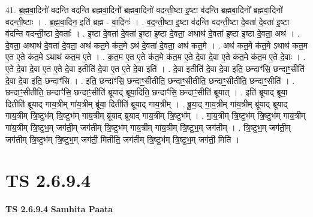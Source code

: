 \documentclass[17pt]{extarticle}
\begin{document}
41. ब्र॒ह्म॒वा॒दिनो॑ वदन्ति वदन्ति ब्रह्मवा॒दिनो᳚ ब्रह्मवा॒दिनो॑ वदन्ती॒ष्टा इ॒ष्टा व॑दन्ति ब्रह्मवा॒दिनो᳚ ब्रह्मवा॒दिनो॑ वदन्ती॒ष्टाः । . ब्र॒ह्म॒वा॒दिन॒ इति॑ ब्रह्म - वा॒दिनः॑ । . व॒द॒न्ती॒ष्टा इ॒ष्टा व॑दन्ति वदन्ती॒ष्टा दे॒वता॑ दे॒वता॑ इ॒ष्टा व॑दन्ति वदन्ती॒ष्टा दे॒वताः᳚ । . इ॒ष्टा दे॒वता॑ दे॒वता॑ इ॒ष्टा इ॒ष्टा दे॒वता॒ अथाथ॑ दे॒वता॑ इ॒ष्टा इ॒ष्टा दे॒वता॒ अथ॑ । . दे॒वता॒ अथाथ॑ दे॒वता॑ दे॒वता॒ अथ॑ कत॒मे क॑त॒मे ऽथ॑ दे॒वता॑ दे॒वता॒ अथ॑ कत॒मे । . अथ॑ कत॒मे क॑त॒मे ऽथाथ॑ कत॒म ए॒त ए॒ते क॑त॒मे ऽथाथ॑ कत॒म ए॒ते । . क॒त॒म ए॒त ए॒ते क॑त॒मे क॑त॒म ए॒ते दे॒वा दे॒वा ए॒ते क॑त॒मे क॑त॒म ए॒ते दे॒वाः । . ए॒ते दे॒वा दे॒वा ए॒त ए॒ते दे॒वा इतीति॑ दे॒वा ए॒त ए॒ते दे॒वा इति॑ । . दे॒वा इतीति॑ दे॒वा दे॒वा इति॒ छन्दाꣳ॑सि॒ छन्दाꣳ॒॒सीति॑ दे॒वा दे॒वा इति॒ छन्दाꣳ॑सि । . इति॒ छन्दाꣳ॑सि॒ छन्दाꣳ॒॒सीतीति॒ छन्दाꣳ॒॒सीतीति॒ छन्दाꣳ॒॒सीतीति॒ छन्दाꣳ॒॒सीति॑ । . छन्दाꣳ॒॒सीतीति॒ छन्दाꣳ॑सि॒ छन्दाꣳ॒॒सीति॑ ब्रूयाद् ब्रूया॒दिति॒ छन्दाꣳ॑सि॒ छन्दाꣳ॒॒सीति॑ ब्रूयात् । . इति॑ ब्रूयाद् ब्रूया॒ दितीति॑ ब्रूयाद् गाय॒त्रीम् गा॑य॒त्रीम् ब्रू॑या॒ दितीति॑ ब्रूयाद् गाय॒त्रीम् । . ब्रू॒या॒द् गा॒य॒त्रीम् गा॑य॒त्रीम् ब्रू॑याद् ब्रूयाद् गाय॒त्रीम् त्रि॒ष्टुभ॑म् त्रि॒ष्टुभ॑म् गाय॒त्रीम् ब्रू॑याद् ब्रूयाद् गाय॒त्रीम् त्रि॒ष्टुभ᳚म् । . गा॒य॒त्रीम् त्रि॒ष्टुभ॑म् त्रि॒ष्टुभ॑म् गाय॒त्रीम् गा॑य॒त्रीम् त्रि॒ष्टुभ॒म् जग॑ती॒म् जग॑तीम् त्रि॒ष्टुभ॑म् गाय॒त्रीम् गा॑य॒त्रीम् त्रि॒ष्टुभ॒म् जग॑तीम् । . त्रि॒ष्टुभ॒म् जग॑ती॒म् जग॑तीम् त्रि॒ष्टुभ॑म् त्रि॒ष्टुभ॒म् जग॑ती॒ मितीति॒ जग॑तीम् त्रि॒ष्टुभ॑म् त्रि॒ष्टुभ॒म् जग॑ती॒ मिति॑ । \newline
\pagebreak
{}

\section{ TS 2.6.9.4 }

\textbf{TS 2.6.9.4 } \newline
\textbf{Samhita Paata} \newline
\end{document}
